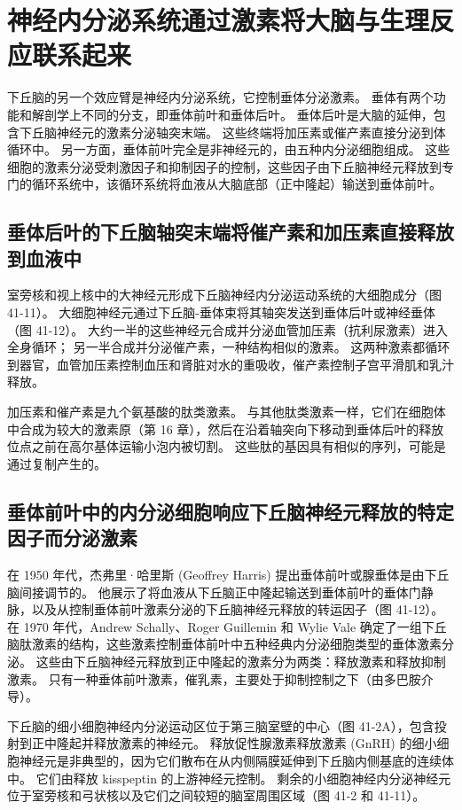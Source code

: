 \section{神经内分泌系统通过激素将大脑与生理反应联系起来}
下丘脑的另一个效应臂是神经内分泌系统，它控制垂体分泌激素。 垂体有两个功能和解剖学上不同的分支，即垂体前叶和垂体后叶。 垂体后叶是大脑的延伸，包含下丘脑神经元的激素分泌轴突末端。 这些终端将加压素或催产素直接分泌到体循环中。 另一方面，垂体前叶完全是非神经元的，由五种内分泌细胞组成。 这些细胞的激素分泌受刺激因子和抑制因子的控制，这些因子由下丘脑神经元释放到专门的循环系统中，该循环系统将血液从大脑底部（正中隆起）输送到垂体前叶。

\subsection{垂体后叶的下丘脑轴突末端将催产素和加压素直接释放到血液中}
室旁核和视上核中的大神经元形成下丘脑神经内分泌运动系统的大细胞成分（图 41-11）。 大细胞神经元通过下丘脑-垂体束将其轴突发送到垂体后叶或神经垂体（图 41-12）。 大约一半的这些神经元合成并分泌血管加压素（抗利尿激素）进入全身循环； 另一半合成并分泌催产素，一种结构相似的激素。 这两种激素都循环到器官，血管加压素控制血压和肾脏对水的重吸收，催产素控制子宫平滑肌和乳汁释放。

加压素和催产素是九个氨基酸的肽类激素。 与其他肽类激素一样，它们在细胞体中合成为较大的激素原（第 16 章），然后在沿着轴突向下移动到垂体后叶的释放位点之前在高尔基体运输小泡内被切割。 这些肽的基因具有相似的序列，可能是通过复制产生的。

\subsection{垂体前叶中的内分泌细胞响应下丘脑神经元释放的特定因子而分泌激素}

在 1950 年代，杰弗里·哈里斯 (Geoffrey Harris) 提出垂体前叶或腺垂体是由下丘脑间接调节的。 他展示了将血液从下丘脑正中隆起输送到垂体前叶的垂体门静脉，以及从控制垂体前叶激素分泌的下丘脑神经元释放的转运因子（图 41-12）。 在 1970 年代，Andrew Schally、Roger Guillemin 和 Wylie Vale 确定了一组下丘脑肽激素的结构，这些激素控制垂体前叶中五种经典内分泌细胞类型的垂体激素分泌。 这些由下丘脑神经元释放到正中隆起的激素分为两类：释放激素和释放抑制激素。 只有一种垂体前叶激素，催乳素，主要处于抑制控制之下（由多巴胺介导）。

下丘脑的细小细胞神经内分泌运动区位于第三脑室壁的中心（图 41-2A），包含投射到正中隆起并释放激素的神经元。 释放促性腺激素释放激素 (GnRH) 的细小细胞神经元是非典型的，因为它们散布在从内侧隔膜延伸到下丘脑内侧基底的连续体中。 它们由释放 kisspeptin 的上游神经元控制。 剩余的小细胞神经内分泌神经元位于室旁核和弓状核以及它们之间较短的脑室周围区域（图 41-2 和 41-11）。

